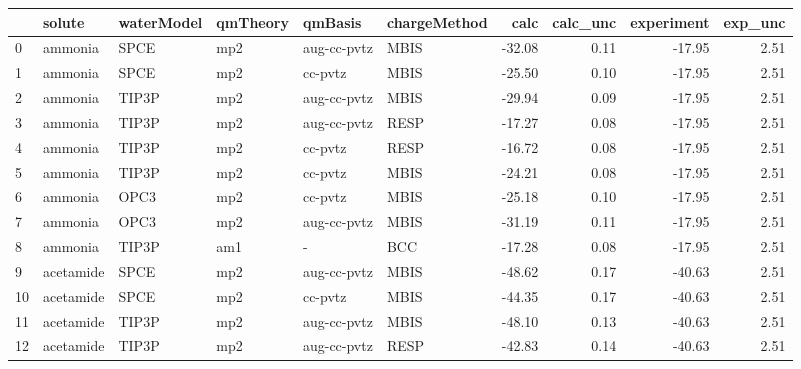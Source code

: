 \begin{tabular}{llllllrrrr}
\toprule
{} &                         solute & waterModel & qmTheory &      qmBasis & chargeMethod &   calc &  calc\_unc &  experiment &  exp\_unc \\
\midrule
0   &                        ammonia &       SPCE &      mp2 &  aug-cc-pvtz &         MBIS & -32.08 &      0.11 &      -17.95 &     2.51 \\
1   &                        ammonia &       SPCE &      mp2 &      cc-pvtz &         MBIS & -25.50 &      0.10 &      -17.95 &     2.51 \\
2   &                        ammonia &      TIP3P &      mp2 &  aug-cc-pvtz &         MBIS & -29.94 &      0.09 &      -17.95 &     2.51 \\
3   &                        ammonia &      TIP3P &      mp2 &  aug-cc-pvtz &         RESP & -17.27 &      0.08 &      -17.95 &     2.51 \\
4   &                        ammonia &      TIP3P &      mp2 &      cc-pvtz &         RESP & -16.72 &      0.08 &      -17.95 &     2.51 \\
5   &                        ammonia &      TIP3P &      mp2 &      cc-pvtz &         MBIS & -24.21 &      0.08 &      -17.95 &     2.51 \\
6   &                        ammonia &       OPC3 &      mp2 &      cc-pvtz &         MBIS & -25.18 &      0.10 &      -17.95 &     2.51 \\
7   &                        ammonia &       OPC3 &      mp2 &  aug-cc-pvtz &         MBIS & -31.19 &      0.11 &      -17.95 &     2.51 \\
8   &                        ammonia &      TIP3P &      am1 &            - &          BCC & -17.28 &      0.08 &      -17.95 &     2.51 \\
9   &                      acetamide &       SPCE &      mp2 &  aug-cc-pvtz &         MBIS & -48.62 &      0.17 &      -40.63 &     2.51 \\
10  &                      acetamide &       SPCE &      mp2 &      cc-pvtz &         MBIS & -44.35 &      0.17 &      -40.63 &     2.51 \\
11  &                      acetamide &      TIP3P &      mp2 &  aug-cc-pvtz &         MBIS & -48.10 &      0.13 &      -40.63 &     2.51 \\
12  &                      acetamide &      TIP3P &      mp2 &  aug-cc-pvtz &         RESP & -42.83 &      0.14 &      -40.63 &     2.51 \\

\end{tabular}
